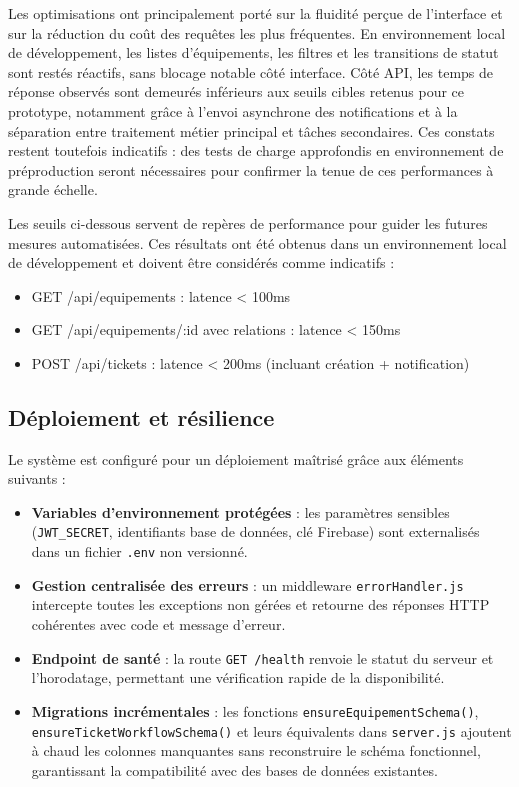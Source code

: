 Les optimisations ont principalement porté sur la fluidité perçue de l'interface et sur la réduction du coût des requêtes les plus fréquentes. En environnement local de développement, les listes d'équipements, les filtres et les transitions de statut sont restés réactifs, sans blocage notable côté interface. Côté API, les temps de réponse observés sont demeurés inférieurs aux seuils cibles retenus pour ce prototype, notamment grâce à l'envoi asynchrone des notifications et à la séparation entre traitement métier principal et tâches secondaires. Ces constats restent toutefois indicatifs : des tests de charge approfondis en environnement de préproduction seront nécessaires pour confirmer la tenue de ces performances à grande échelle.

Les seuils ci-dessous servent de repères de performance pour guider les futures mesures automatisées. Ces résultats ont été obtenus dans un environnement local de développement et doivent être considérés comme indicatifs :
\begin{itemize}
    \item GET /api/equipements : latence < 100ms
    \item GET /api/equipements/:id avec relations : latence < 150ms
    \item POST /api/tickets : latence < 200ms (incluant création + notification)
\end{itemize}

\subsection{Déploiement et résilience}
\label{subsec:deployment_resilience}

Le système est configuré pour un déploiement maîtrisé grâce aux éléments suivants :

\begin{itemize}
    \item \textbf{Variables d'environnement protégées} : les paramètres sensibles
          (\texttt{JWT\_SECRET}, identifiants base de données, clé Firebase) sont
          externalisés dans un fichier \texttt{.env} non versionné.
    \item \textbf{Gestion centralisée des erreurs} : un middleware \texttt{errorHandler.js}
          intercepte toutes les exceptions non gérées et retourne des réponses
          HTTP cohérentes avec code et message d'erreur.
    \item \textbf{Endpoint de santé} : la route \texttt{GET /health} renvoie le statut
          du serveur et l'horodatage, permettant une vérification rapide de la disponibilité.
    \item \textbf{Migrations incrémentales} : les fonctions \texttt{ensureEquipementSchema()},
          \texttt{ensureTicketWorkflowSchema()} et leurs équivalents dans \texttt{server.js}
          ajoutent à chaud les colonnes manquantes sans reconstruire le schéma fonctionnel,
          garantissant la compatibilité avec des bases de données existantes.
\end{itemize}

